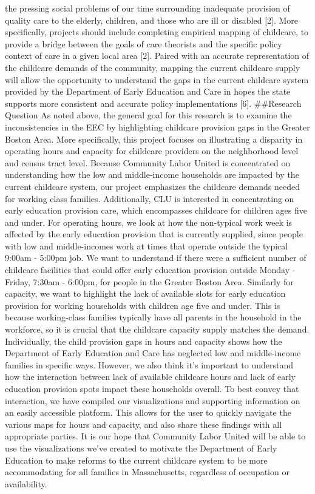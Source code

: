 \documentclass[10pt,letterpaper]{article}
\begin{document}
the pressing social problems of our time surrounding inadequate
provision of quality care to the elderly, children, and those who are
ill or disabled {[}2{]}. More specifically, projects should include
completing empirical mapping of childcare, to provide a bridge between
the goals of care theorists and the specific policy context of care in a
given local area {[}2{]}. Paired with an accurate representation of the
childcare demands of the community, mapping the current childcare supply
will allow the opportunity to understand the gaps in the current
childcare system provided by the Department of Early Education and Care
in hopes the state supports more consistent and accurate policy
implementations {[}6{]}. \#\#Research Question As noted above, the
general goal for this research is to examine the inconsistencies in the
EEC by highlighting childcare provision gaps in the Greater Boston Area.
More specifically, this project focuses on illustrating a disparity in
operating hours and capacity for childcare providers on the neighborhood
level and census tract level. Because Community Labor United is
concentrated on understanding how the low and middle-income households
are impacted by the current childcare system, our project emphasizes the
childcare demands needed for working class families. Additionally, CLU
is interested in concentrating on early education provision care, which
encompasses childcare for children ages five and under. For operating
hours, we look at how the non-typical work week is affected by the early
education provision that is currently supplied, since people with low
and middle-incomes work at times that operate outside the typical 9:00am
- 5:00pm job. We want to understand if there were a sufficient number of
childcare facilities that could offer early education provision outside
Monday - Friday, 7:30am - 6:00pm, for people in the Greater Boston Area.
Similarly for capacity, we want to highlight the lack of available slots
for early education provision for working households with children age
five and under. This is because working-class families typically have
all parents in the household in the workforce, so it is crucial that the
childcare capacity supply matches the demand.\\
Individually, the child provision gaps in hours and capacity shows how
the Department of Early Education and Care has neglected low and
middle-income families in specific ways. However, we also think it's
important to understand how the interaction between lack of available
childcare hours and lack of early education provision spots impact these
households overall. To best convey that interaction, we have compiled
our visualizations and supporting information on an easily accessible
platform. This allows for the user to quickly navigate the various maps
for hours and capacity, and also share these findings with all
appropriate parties. It is our hope that Community Labor United will be
able to use the visualizations we've created to motivate the Department
of Early Education to make reforms to the current childcare system to be
more accommodating for all families in Massachusetts, regardless of
occupation or availability.
\end{document}
